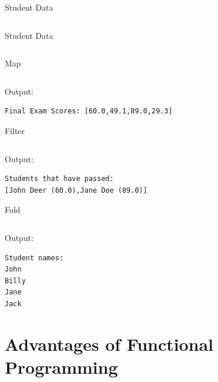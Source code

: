 \documentclass{beamer}
\begin{document}
\begin{frame}{Student Data}

  \inputminted[firstline=1,lastline=3]{haskell}{code/studentfilter.hs}

\end{frame}


\begin{frame}{Student Data}

  \inputminted[firstline=9,lastline=20,gobble=11]{haskell}{code/studentmap.hs}

\end{frame}

\begin{frame}[fragile]{Map}

  \inputminted[firstline=6,lastline=7]{haskell}{code/studentmap.hs}

  \vskip5mm

Output:
  \begin{verbatim}
Final Exam Scores: [60.0,49.1,89.0,29.3]
  \end{verbatim}

\end{frame}

\begin{frame}[fragile]{Filter}

  \inputminted[firstline=8,lastline=12]{haskell}{code/studentfilter.hs}

  \vskip5mm

Output:
  \begin{verbatim}
Students that have passed:
[John Deer (60.0),Jane Doe (89.0)]
  \end{verbatim}

\end{frame}


\begin{frame}[fragile]{Fold}

  \inputminted[firstline=10,lastline=13]{haskell}{code/studentfold.hs}

  \vskip5mm

Output:
  \begin{verbatim}
Student names:
John
Billy
Jane
Jack
  \end{verbatim}

\end{frame}

\section{Advantages of Functional Programming}
\end{document}
